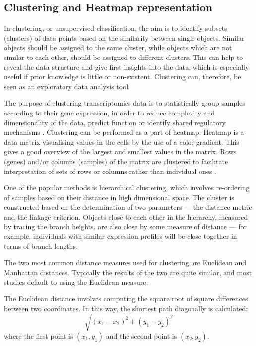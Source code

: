  
  
    \subsection{Clustering and Heatmap representation}
    
    In clustering, or unsupervised classification, the aim is to identify subsets (clusters) of data points based on the similarity between single objects. Similar objects should be assigned to the same cluster, while objects which are not similar to each other, should be assigned to different clusters. This can help to reveal the data structure and give first insights into the data, which is especially useful if prior knowledge is little or non-existent. Clustering can, therefore, be seen as an exploratory data analysis tool. 
        
    The purpose of clustering transcriptomics data is to statistically group samples according to their gene expression, in order to reduce complexity and dimensionality of the data, predict function or identify shared regulatory mechanisms \cite{Metsalu2015ClustVis:Heatmap}. Clustering can be performed as a part of heatmap. Heatmap is a data matrix visualising values in the cells by the use of a color gradient. This gives a good overview of the largest and smallest values in the matrix. Rows (genes) and/or columns (samples) of the matrix are clustered to facilitate interpretation of sets of rows or columns rather than individual ones \cite{Metsalu2015ClustVis:Heatmap}.
    
    \newpage
    One of the popular methods is hierarchical clustering, which involves re-ordering of samples based on their distance in high dimensional space. The cluster is constructed based on the determination of two parameters — the distance metric and the linkage criterion. Objects close to each other in the hierarchy, measured by tracing the branch heights, are also close by some measure of distance — for example, individuals with similar expression profiles will be close together in terms of branch lengths.
    
    
    The two most common distance measures used for clustering are Euclidean and Manhattan distances. Typically the results of the two are quite similar, and most studies default to using the Euclidean measure. 
    
    The Euclidean distance involves computing the square root of square differences between two coordinates. In this way, the shortest path diagonally is calculated: $$ \sqrt{(x_{1}-x_{2})^{2}+(y_{1}-y_{2})^{2}}$$ where the first point is $(x_1, y_1)$ and the second point is $(x_2, y_2).$
    
